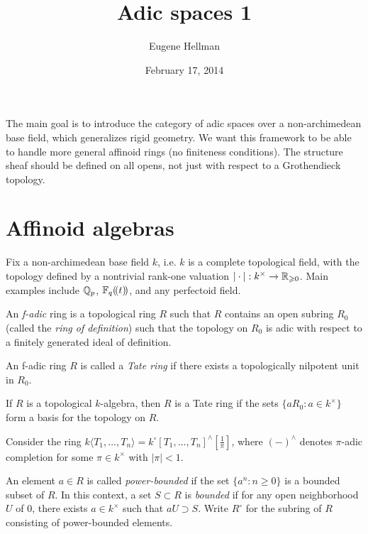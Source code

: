 \documentclass{article}
\title{Adic spaces 1}
\author{Eugene Hellman}
\date{February 17, 2014}
\begin{document}
\maketitle





The main goal is to introduce the category of adic spaces over a 
non-archimedean base field, which generalizes rigid geometry. We want this 
framework to be able to handle more general affinoid rings (no finiteness 
conditions). The structure sheaf should be defined on all opens, not just 
with respect to a Grothendieck topology. 





\section{Affinoid algebras}

Fix a non-archimedean base field $k$, i.e. $k$ is a complete topological field, 
with the topology defined by a nontrivial rank-one valuation 
$|\cdot |:k^\times \to \mathbb{R}_{\geqslant 0}$. Main examples include $\mathbb{Q}_p$, 
$\mathbb{F}_q(\!( {t} )\!)$, and any perfectoid field. 

\begin{definition}
An \emph{f-adic} ring is a topological ring $R$ such that $R$ contains an open 
subring $R_0$ (called the \emph{ring of definition}) such that the topology 
on $R_0$ is adic with respect to a finitely generated ideal of definition. 
\end{definition}

\begin{definition}
An f-adic ring $R$ is called a \emph{Tate ring} if there exists a topologically 
nilpotent unit in $R_0$. 
\end{definition}

If $R$ is a topological $k$-algebra, then $R$ is a Tate ring if the sets 
$\{a R_0:a\in k^\times\}$ form a basis for the topology on $R$. 

\begin{example}
Consider the ring 
$k\langle T_1,\dots,T_n\rangle = k^\circ[T_1,\dots,T_n]^\wedge[\frac 1 \pi]$, 
where $(-)^\wedge$ denotes $\pi$-adic completion for some $\pi\in k^\times$ with 
$|\pi|<1$. 
\end{example}

An element $a\in R$ is called \emph{power-bounded} if the set 
$\{a^n:n\geqslant 0\}$ is a bounded subset of $R$. In this context, a set 
$S\subset R$ is \emph{bounded} if for any open neighborhood $U$ of $0$, there 
exists $a\in k^\times$ such that $a U\supset S$. Write $R^\circ$ for the 
subring of $R$ consisting of power-bounded elements. 
\end{document}
